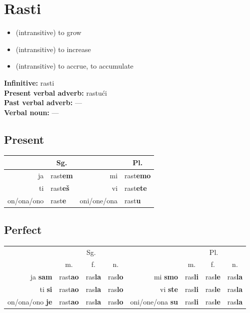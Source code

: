 \documentclass[a4paper]{article}
\begin{document}
\section*{Rasti}
\begin{itemize}
  \item (intransitive) to grow
  \item (intransitive) to increase
  \item (intransitive) to accrue, to accumulate
\end{itemize}

\textbf{Infinitive:} rasti\\
\textbf{Present verbal adverb:} rastući\\
\textbf{Past verbal adverb:} —\\
\textbf{Verbal noun:} —\\

\subsection*{Present}
\begin{tabular}{r@{ }lr@{ }l}
  & \multicolumn{1}{c}{Sg.} & & \multicolumn{1}{c}{Pl.} \\
  \midrule
  ja & rast\textbf{em} & mi & rast\textbf{emo} \\
  ti & rast\textbf{eš} & vi & rast\textbf{ete} \\
  on/ona/ono & rast\textbf{e} & oni/one/ona & rast\textbf{u} \\
  \bottomrule
\end{tabular}

\subsection*{Perfect}
\begin{tabular}{r@{ }c@{ / }c@{ / }cr@{ }c@{ / }c@{ / }c}
	                       &              \multicolumn{3}{c}{Sg.}              &                         &             \multicolumn{3}{c}{Pl.}              \\
	                       &       m.        &       f.       &       n.       &                         &       m.       &       f.       &       n.       \\ \midrule
	       ja \textbf{sam} & rast\textbf{ao} & ras\textbf{la} & ras\textbf{lo} &         mi \textbf{smo} & ras\textbf{li} & ras\textbf{le} & ras\textbf{la} \\
	        ti \textbf{si} & rast\textbf{ao} & ras\textbf{la} & ras\textbf{lo} &         vi \textbf{ste} & ras\textbf{li} & ras\textbf{le} & ras\textbf{la} \\
	on/ona/ono \textbf{je} & rast\textbf{ao} & ras\textbf{la} & ras\textbf{lo} & oni/one/ona \textbf{su} & ras\textbf{li} & ras\textbf{le} & ras\textbf{la} \\ \bottomrule
\end{tabular}
\end{document}
